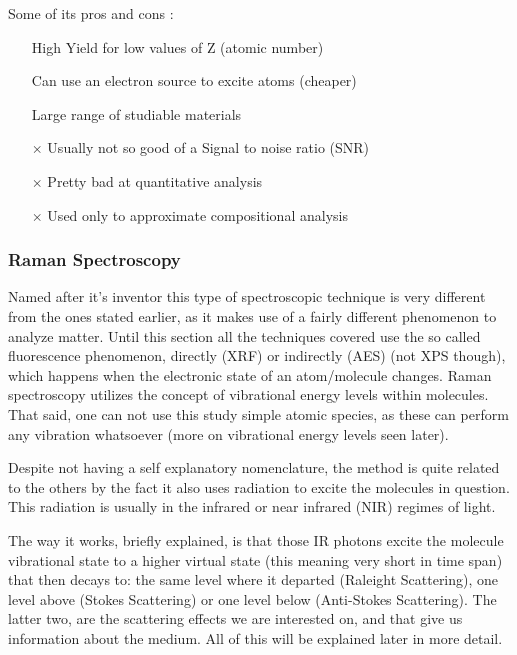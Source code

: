 \documentclass[]{article}
\begin{document}
\newpage

Some of its pros and cons \cite{TH_Many}:
\begin{itemize}
\item[\checkmark] High Yield for low values of Z (atomic number)
\item[\checkmark] Can use an electron source to excite atoms (cheaper)
\item[\checkmark] Large range of studiable materials
\item[$\times$] Usually not so good of a Signal to noise ratio (SNR)
\item[$\times$] Pretty bad at quantitative analysis
\item[$\times$] Used only to approximate compositional analysis
\end{itemize}

\subsubsection{Raman Spectroscopy} \label{RMS}
Named after it's inventor this type of spectroscopic technique is very different from the ones stated earlier, as it makes use of a fairly different phenomenon to analyze matter. Until this section all the techniques covered use the so called fluorescence phenomenon, directly (XRF) or indirectly (AES) (not XPS though), which happens when the electronic state of an atom/molecule changes. Raman spectroscopy utilizes the concept of vibrational energy levels within molecules. That said, one can not use this study simple atomic species, as these can perform any vibration whatsoever (more on vibrational energy levels seen later).
\par Despite not having a self explanatory nomenclature, the method is quite related to the others by the fact it also uses radiation to excite the molecules in question. This radiation is usually in the infrared or near infrared (NIR) regimes of light.
\par The way it works, briefly explained, is that those IR photons excite the molecule vibrational state to a higher virtual state (this meaning very short in time span) that then decays to: the same level where it departed (Raleight Scattering), one level above (Stokes Scattering) or one level below (Anti-Stokes Scattering). The latter two, are the scattering effects we are interested on, and that give us information about the medium. All of this will be explained later in more detail.\\
\end{document}
